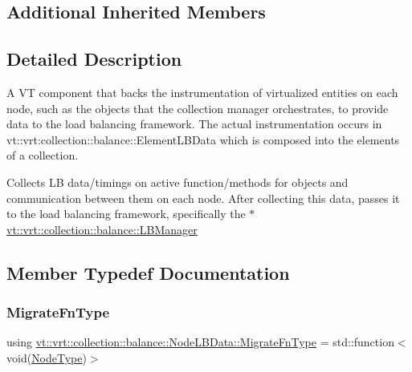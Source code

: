 \subsection*{Additional Inherited Members}


\subsection{Detailed Description}
A VT component that backs the instrumentation of virtualized entities on each node, such as the objects that the collection manager orchestrates, to provide data to the load balancing framework. The actual instrumentation occurs in {\ttfamily vt\+::vrt\+:collection\+:}\+:balance\+::\+Element\+L\+B\+Data which is composed into the elements of a collection. 

Collects LB data/timings on active function/methods for objects and communication between them on each node. After collecting this data, passes it to the load balancing framework, specifically the {\ttfamily $\ast$} \hyperlink{structvt_1_1vrt_1_1collection_1_1balance_1_1_l_b_manager}{vt\+::vrt\+::collection\+::balance\+::\+L\+B\+Manager} 

\subsection{Member Typedef Documentation}
\mbox{\label{structvt_1_1vrt_1_1collection_1_1balance_1_1_node_l_b_data_a200140e389d08dc8d74db16589e736bc}} 
\subsubsection{\texorpdfstring{Migrate\+Fn\+Type}{MigrateFnType}}
{\footnotesize\ttfamily using \hyperlink{structvt_1_1vrt_1_1collection_1_1balance_1_1_node_l_b_data_a200140e389d08dc8d74db16589e736bc}{vt\+::vrt\+::collection\+::balance\+::\+Node\+L\+B\+Data\+::\+Migrate\+Fn\+Type} =  std\+::function$<$void(\hyperlink{namespacevt_a866da9d0efc19c0a1ce79e9e492f47e2}{Node\+Type})$>$}

\mbox{\label{structvt_1_1vrt_1_1collection_1_1balance_1_1_node_l_b_data_adf6ad57c147c8e9d6b47e07a437bb1a6}} 
